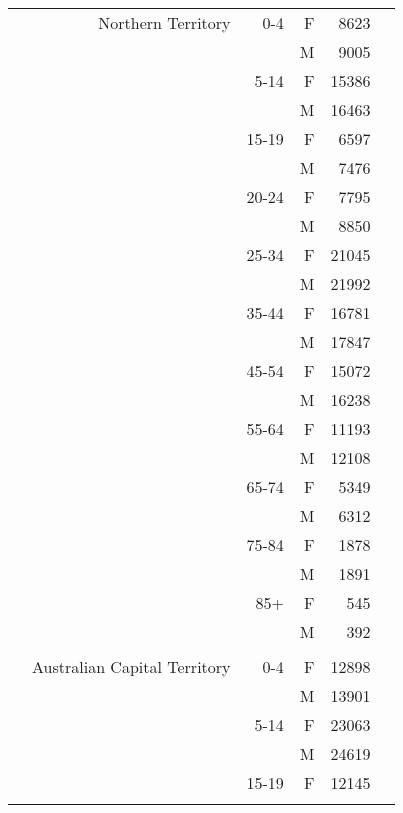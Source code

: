 \begin{tabular}{@{}c@{}rrrr@{}c@{}}
\phantom{.} &             Northern Territory &    0-4 &  F &    8623 &\tabularnewline\relax 
\phantom{.} &                                &        &  M &    9005 &\tabularnewline\relax 
\phantom{.} &                                &   5-14 &  F &   15386 &\tabularnewline\relax 
\phantom{.} &                                &        &  M &   16463 &\tabularnewline\relax 
\phantom{.} &                                &  15-19 &  F &    6597 &\tabularnewline\relax 
\phantom{.} &                                &        &  M &    7476 &\tabularnewline\relax 
\phantom{.} &                                &  20-24 &  F &    7795 &\tabularnewline\relax 
\phantom{.} &                                &        &  M &    8850 &\tabularnewline\relax 
\phantom{.} &                                &  25-34 &  F &   21045 &\tabularnewline\relax 
\phantom{.} &                                &        &  M &   21992 &\tabularnewline\relax 
\phantom{.} &                                &  35-44 &  F &   16781 &\tabularnewline\relax 
\phantom{.} &                                &        &  M &   17847 &\tabularnewline\relax 
\phantom{.} &                                &  45-54 &  F &   15072 &\tabularnewline\relax 
\phantom{.} &                                &        &  M &   16238 &\tabularnewline\relax 
\phantom{.} &                                &  55-64 &  F &   11193 &\tabularnewline\relax 
\phantom{.} &                                &        &  M &   12108 &\tabularnewline\relax 
\phantom{.} &                                &  65-74 &  F &    5349 &\tabularnewline\relax 
\phantom{.} &                                &        &  M &    6312 &\tabularnewline\relax 
\phantom{.} &                                &  75-84 &  F &    1878 &\tabularnewline\relax 
\phantom{.} &                                &        &  M &    1891 &\tabularnewline\relax 
\phantom{.} &                                &    85+ &  F &     545 &\tabularnewline\relax 
\phantom{.} &                                &        &  M &     392 &\tabularnewline\relax 
\phantom{.} &            &            &            &            &\tabularnewline[0.5\baselineskip]
\phantom{.} &   Australian Capital Territory &    0-4 &  F &   12898 &\tabularnewline\relax 
\phantom{.} &                                &        &  M &   13901 &\tabularnewline\relax 
\phantom{.} &                                &   5-14 &  F &   23063 &\tabularnewline\relax 
\phantom{.} &                                &        &  M &   24619 &\tabularnewline\relax 
\phantom{.} &                                &  15-19 &  F &   12145 &\tabularnewline\relax 

\end{tabular}
